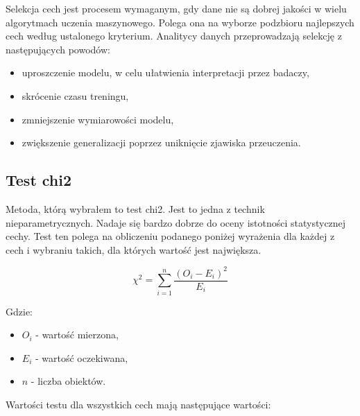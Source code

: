     Selekcja cech jest procesem wymaganym, gdy dane nie są dobrej jakości w wielu algorytmach uczenia maszynowego.
    Polega ona na wyborze podzbioru najlepszych cech według ustalonego kryterium.
    Analitycy danych przeprowadzają selekcję z następujących powodów:
    \begin{itemize}
        \item uproszczenie modelu, w celu ułatwienia interpretacji przez badaczy,
        \item skrócenie czasu treningu,
        \item zmniejszenie wymiarowości modelu,
        \item zwiększenie generalizacji poprzez uniknięcie zjawiska przeuczenia.
    \end{itemize}

    \subsection{Test chi2}\label{subsec:testChi2}

    Metoda, którą wybrałem to test chi2.
    Jest to jedna z technik nieparametrycznych.
    Nadaje się bardzo dobrze do oceny istotności statystycznej cechy.
    Test ten polega na obliczeniu podanego poniżej wyrażenia dla każdej z cech i wybraniu takich, dla których wartość jest największa.

    \[
        \chi ^ 2 = \sum_{i=1}^{n}{ \frac{{(O_i - E_i) ^ 2}}{E_i}}
    \]

    \noindent
    Gdzie:
    \begin{itemize}
        \item $O_i$ - wartość mierzona,
        \item $E_i$ - wartość oczekiwana,
        \item $n$ - liczba obiektów.
    \end{itemize}

    Wartości testu dla wszystkich cech mają następujące wartości:

    \vspace{1em}

